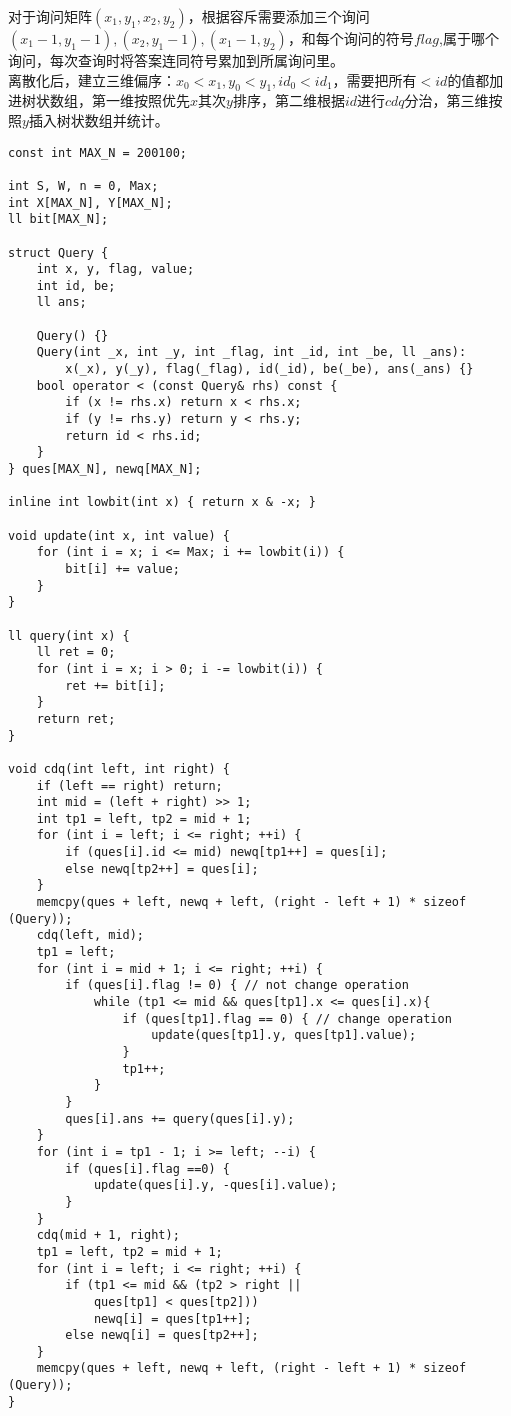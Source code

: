 对于询问矩阵$(x_1,y_1,x_2,y_2)$，根据容斥需要添加三个询问$(x_1-1,y_1-1),(x_2,y_1-1),(x_1-1,y_2)$，和每个询问的符号$flag$,属于哪个询问，每次查询时将答案连同符号累加到所属询问里。\\
离散化后，建立三维偏序：$x_0 < x_1,y_0 < y_1,id_0 < id_1$，需要把所有$< id$的值都加进树状数组，第一维按照优先$x$其次$y$排序，第二维根据$id$进行$cdq$分治，第三维按照$y$插入树状数组并统计。
\begin{lstlisting}
const int MAX_N = 200100;

int S, W, n = 0, Max;
int X[MAX_N], Y[MAX_N];
ll bit[MAX_N];

struct Query {
    int x, y, flag, value;
    int id, be;
    ll ans;

    Query() {}
    Query(int _x, int _y, int _flag, int _id, int _be, ll _ans):
        x(_x), y(_y), flag(_flag), id(_id), be(_be), ans(_ans) {}
    bool operator < (const Query& rhs) const {
        if (x != rhs.x) return x < rhs.x;
        if (y != rhs.y) return y < rhs.y;
        return id < rhs.id;
    }
} ques[MAX_N], newq[MAX_N];

inline int lowbit(int x) { return x & -x; }

void update(int x, int value) {
    for (int i = x; i <= Max; i += lowbit(i)) {
        bit[i] += value;
    }
}

ll query(int x) {
    ll ret = 0;
    for (int i = x; i > 0; i -= lowbit(i)) {
        ret += bit[i];
    }
    return ret;
}

void cdq(int left, int right) {
    if (left == right) return;
    int mid = (left + right) >> 1;
    int tp1 = left, tp2 = mid + 1;
    for (int i = left; i <= right; ++i) {
        if (ques[i].id <= mid) newq[tp1++] = ques[i];
        else newq[tp2++] = ques[i];
    }
    memcpy(ques + left, newq + left, (right - left + 1) * sizeof (Query));
    cdq(left, mid);
    tp1 = left;
    for (int i = mid + 1; i <= right; ++i) {
        if (ques[i].flag != 0) { // not change operation
            while (tp1 <= mid && ques[tp1].x <= ques[i].x){
                if (ques[tp1].flag == 0) { // change operation
                    update(ques[tp1].y, ques[tp1].value);
                }
                tp1++;
            }
        }
        ques[i].ans += query(ques[i].y);
    }
    for (int i = tp1 - 1; i >= left; --i) {
        if (ques[i].flag ==0) {
            update(ques[i].y, -ques[i].value);
        }
    }
    cdq(mid + 1, right);
    tp1 = left, tp2 = mid + 1;
    for (int i = left; i <= right; ++i) {
        if (tp1 <= mid && (tp2 > right ||
            ques[tp1] < ques[tp2]))
            newq[i] = ques[tp1++];
        else newq[i] = ques[tp2++];
    }
    memcpy(ques + left, newq + left, (right - left + 1) * sizeof (Query));
}


\end{lstlisting}
